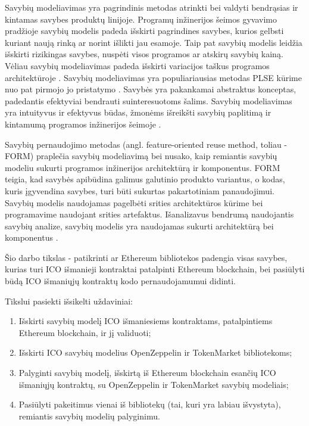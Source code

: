 \documentclass{VUMIFPSbakalaurinis}
\begin{document}
Savybių modeliavimas yra pagrindinis metodas atrinkti bei valdyti bendrąsias ir kintamas savybes produktų linijoje. Programų inžinerijos šeimos gyvavimo pradžioje savybių modelis padeda išskirti pagrindines savybes, kurios gelbsti kuriant naują rinką ar  norint išlikti jau esamoje. Taip pat savybių modelis leidžia išskirti rizikingas savybes, nuspėti visos programos ar atskirų savybių kainą. Vėliau savybių modeliavimas padeda išskirti variacijos taškus programos architektūroje \cite{Czarnecki2004}. Savybių modeliavimas yra populiariausias metodas PLSE kūrime nuo pat pirmojo jo pristatymo \cite{Kang1990}. Savybės yra pakankamai abstraktus konceptas, padedantis efektyviai bendrauti suinteresuotoms šalims. Savybių modeliavimas yra intuityvus ir efektyvus būdas, žmonėms išreikšti savybių paplitimą ir kintamumą programos inžinerijos šeimoje \cite{Kang2013}.

Savybių pernaudojimo metodas (angl. feature-oriented reuse method, toliau - FORM) praplečia savybių modeliavimą bei nusako, kaip remiantis savybių modeliu sukurti programos inžinerijos architektūrą ir komponentus. FORM teigia, kad savybės apibūdina galimus galutinio produkto variantus, o kodas, kuris įgyvendina savybes, turi būti sukurtas pakartotiniam panaudojimui. Savybių modelis naudojamas pagelbėti srities architektūros kūrime bei programavime naudojant srities artefaktus. Išanalizavus bendrumą naudojantis savybių analize, savybių modelis yra naudojamas sukurti architektūrą bei komponentus \cite{Kang}.

Šio darbo tikslas - patikrinti ar Ethereum bibliotekos padengia visas savybes, kurias turi ICO išmanieji kontraktai patalpinti Ethereum blockchain, bei pasiūlyti būdą ICO išmaniųjų kontraktų kodo pernaudojamumui didinti.


Tikslui pasiekti išsikelti uždaviniai:
\begin{enumerate}[topsep=0pt,itemsep=-1ex,partopsep=1ex,parsep=1ex]
\item Išskirti savybių modelį ICO išmaniesiems kontraktams, patalpintiems Ethereum blockchain, ir jį validuoti;
\item Išskirti ICO savybių modelius OpenZeppelin ir TokenMarket bibliotekoms;
\item Palyginti savybių modelį, išskirtą iš Ethereum blockchain esančių ICO išmaniųjų kontraktų, su OpenZeppelin ir TokenMarket savybių modeliais;
\item Pasiūlyti pakeitimus vienai iš bibliotekų (tai, kuri yra labiau išvystyta), remiantis savybių modelių palyginimu.
\end{enumerate}
\end{document}
